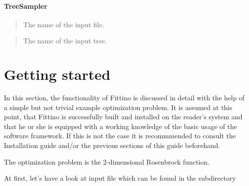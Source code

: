 \documentclass[letterpaper,10pt,english]{sphinxmanual}
\begin{document}
\paragraph{TreeSampler}
\label{tree_sampler:treesampler}\label{tree_sampler::doc}

\begin{quote}

The name of the input file.
\end{quote}

\begin{quote}

The name of the input tree.
\end{quote}


\section{Getting started}
\label{getting_started:getting-started}\label{getting_started::doc}\label{getting_started:id1}
In this section, the functionality of Fittino is discussed in detail with the help of a simple but
not trivial example optimization problem. It is assumed at this point, that Fittino is successfully
built and installed on the reader's system and that he or she is equipped with a working knowledge
of the basic usage of the software framework. If this is not the case it is recommmended to consult
the Installation guide and/or the previous sections of this guide beforehand.

The optimization problem is the 2-dimensional Rosenbrock function.

At first, let's have a look at input file  which can be found
in the  subdirectory
\end{document}
